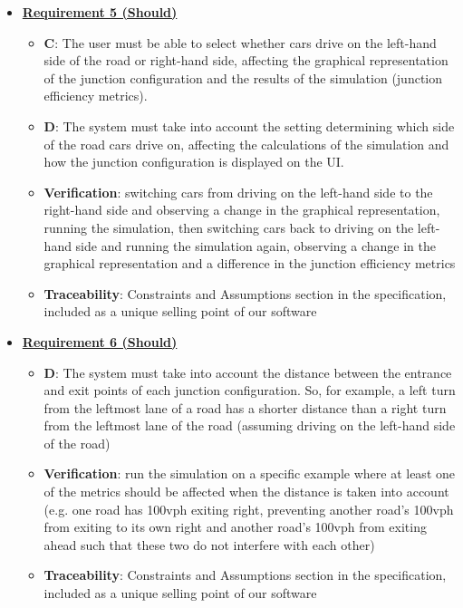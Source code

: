 \documentclass{article}
\begin{document}
\begin{itemize}
    \item \textbf{\underline{Requirement 5 (Should)}}
    \begin{itemize}
        \item \textbf{C}: The user must be able to select whether cars drive on the left-hand side of 
            the road or right-hand side, affecting the graphical representation of the junction
            configuration and the results of the simulation (junction efficiency metrics).
        \item \textbf{D}: The system must take into account the setting determining which side of
            the road cars drive on, affecting the calculations of the simulation and how 
            the junction configuration is displayed on the UI.
        \item \textbf{Verification}: switching cars from driving on the left-hand side to the 
            right-hand side and observing a change in the graphical representation, running 
            the simulation, then switching cars back to driving on the left-hand side and 
            running the simulation again, observing a change in the graphical representation 
            and a difference in the junction efficiency metrics
        \item\textbf{Traceability}: Constraints and Assumptions section in the specification, included 
            as a unique selling point of our software
    \end{itemize}

    \item \textbf{\underline{Requirement 6 (Should)}}
    \begin{itemize}
        \item \textbf{D}: The system must take into account the distance between the entrance and exit 
            points of each junction configuration. So, for example, a left turn from the 
            leftmost lane of a road has a shorter distance than a right turn from the leftmost 
            lane of the road (assuming driving on the left-hand side of the road)
        \item \textbf{Verification}: run the simulation on a specific example where at least one of 
            the metrics should be affected when the distance is taken into account (e.g. one 
            road has 100vph exiting right, preventing another road’s 100vph from exiting to its
            own right and another road’s 100vph from exiting ahead such that these two do not 
            interfere with each other)
        \item\textbf{Traceability}: Constraints and Assumptions section in the specification, included 
            as a unique selling point of our software
    \end{itemize}


\end{itemize}
\end{document}
